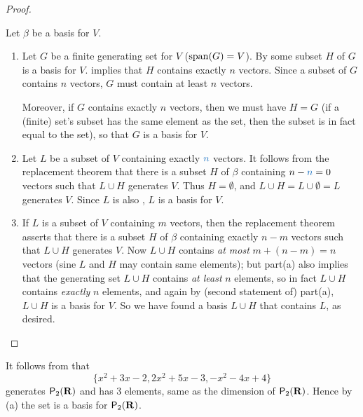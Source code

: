 \begin{proof}\ 

Let \(\beta\) be a basis for \(V\).
\begin{enumerate}
\item Let \(G\) be a finite generating set for \(V\) (\(\operatorname{span}(G) = V\)).
    By  some subset \(H\) of \(G\) is a basis for \(V\).  implies that \(H\) contains exactly \(n\) vectors.
    Since a subset of \(G\) contains \(n\) vectors, \(G\) must contain at least \(n\) vectors.
    
    Moreover, if \(G\) contains exactly \(n\) vectors, then we must have \(H = G\) (if a (finite) set's subset has the same element as the set, then the subset is in fact equal to the set), so that \(G\) is a basis for \(V\).
\item Let \(L\) be a \LID{} subset of \(V\) containing exactly \(\BLUE{n}\) vectors.
    It follows from the replacement theorem  that there is a subset \(H\) of \(\beta\) containing \(n - \BLUE{n} = 0\) vectors such that \(L \cup H\) generates \(V\).
    Thus \(H = \emptyset\), and \(L \cup H = L \cup \emptyset = L\) generates \(V\). Since \(L\) is also \LID{}, \(L\) is a basis for \(V\).
\item If \(L\) is a \LID{} subset of \(V\) containing \(m\) vectors, then the replacement theorem  asserts that there is a subset \(H\) of \(\beta\) containing exactly \(n - m\) vectors such that \(L \cup H\) generates \(V\).
    Now \(L \cup H\) contains \emph{at most} \(m + (n - m) = n\) vectors (sine \(L\) and \(H\) may contain same elements);
    but part(a) also implies that the generating set \(L \cup H\) contains \emph{at least} \(n\) elements, so in fact \(L \cup H\) contains \emph{exactly} \(n\) elements, and again by (second statement of) part(a), \(L \cup H\) is a basis for \(V\).
    So we have found a basis \(L \cup H\) that contains \(L\), as desired.
\end{enumerate}
\end{proof}

\begin{example} \label{1.6.14}
It follows from  that
\[
    \{ x^2 + 3x - 2, 2x^2 + 5x - 3, -x^2 -4x + 4 \}
\]
generates \(\textsf{P}_2(\mathbf{R})\) and has \(3\) elements, same as the dimension of \(\textsf{P}_2(\mathbf{R})\).
Hence by (a) the set is a basis for \(\textsf{P}_2(\mathbf{R})\).
\end{example}

